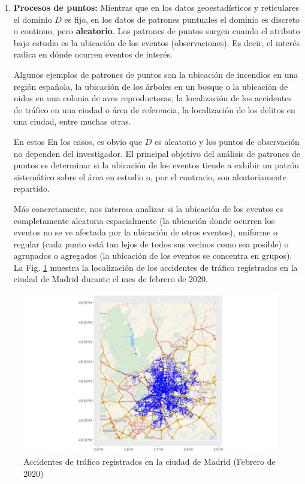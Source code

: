 \documentclass[
]{book}
\theoremstyle{definition}
\theoremstyle{definition}
\theoremstyle{definition}
\theoremstyle{definition}
\theoremstyle{remark}
\begin{document}
\begin{enumerate}
\def\labelenumi{\arabic{enumi}.}
\setcounter{enumi}{2}
\item
  \textbf{Procesos de puntos:} Mientras que en los datos geoestadísticos y
  reticulares el dominio \(D\) es fijo, en los datos de patrones puntuales el
  dominio es discreto o continuo, pero \textbf{aleatorio}. Los patrones de puntos
  surgen cuando el atributo bajo estudio es la ubicación de los eventos
  (observaciones). Es decir, el interés radica en dónde ocurren eventos de
  interés.

  Algunos ejemplos de patrones de puntos son la ubicación de incendios en una
  región española, la ubicación de los árboles en un bosque o la ubicación de
  nidos en una colonia de aves reproductoras, la localización de los
  accidentes de tráfico en una ciudad o área de referencia, la localización de
  los delitos en una ciudad, entre muchas otras.

  En estos En los casos, es obvio que \(D\) es aleatorio y los puntos de
  observación no dependen del investigador. El principal objetivo del análisis
  de patrones de puntos es determinar si la ubicación de los eventos tiende a
  exhibir un patrón sistemático sobre el área en estudio o, por el contrario,
  son aleatoriamente repartido.

  Más concretamente, nos interesa analizar si la ubicación de los eventos es
  completamente aleatoria espacialmente (la ubicación donde ocurren los
  eventos no se ve afectada por la ubicación de otros eventos), uniforme o
  regular (cada punto está tan lejos de todos sus vecinos como sea posible) o
  agrupados o agregados (la ubicación de los eventos se concentra en grupos).
  La Fig. \ref{fig:ejem-pp} muestra la localización de los accidentes de
  tráfico registrados en la ciudad de Madrid durante el mes de febrero
  de 2020.
\end{enumerate}

\begin{figure}

{\centering \includegraphics[width=0.6\linewidth]{img/traf_madrid_feb_2020} 

}

\caption{Accidentes de tráfico registrados en la ciudad de Madrid (Febrero de 2020)}\label{fig:ejem-pp}
\end{figure}
\end{document}
